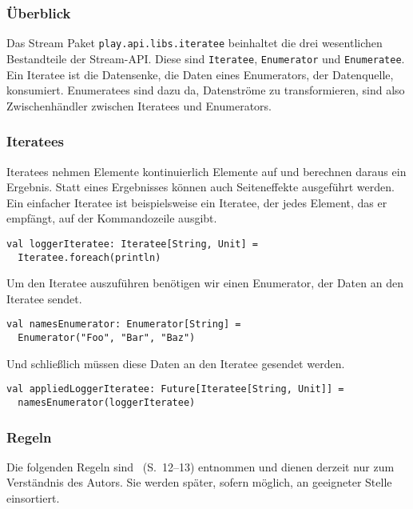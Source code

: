 \documentclass[draft=false
              ,paper=a4
              ,twoside=false
              ,fontsize=11pt
              ,headsepline
              ,BCOR10mm
              ,DIV11
              ]{scrbook}
\begin{document}
\subsubsection{Überblick} %
\label{sssec:streams_ueberblick}

Das Stream Paket \lstinline|play.api.libs.iteratee| beinhaltet die drei wesentlichen Bestandteile der Stream-API.
Diese sind \lstinline|Iteratee|, \lstinline|Enumerator| und \lstinline|Enumeratee|.
Ein Iteratee ist die Datensenke, die Daten eines Enumerators, der Datenquelle, konsumiert.
Enumeratees sind dazu da, Datenströme zu transformieren, sind also Zwischenhändler zwischen Iteratees und Enumerators.



\subsubsection{Iteratees} %
\label{sssec:iteratees}

Iteratees nehmen Elemente kontinuierlich Elemente auf und berechnen daraus ein Ergebnis.
Statt eines Ergebnisses können auch Seiteneffekte ausgeführt werden.
Ein einfacher Iteratee ist beispielsweise ein Iteratee, der jedes Element, das er empfängt, auf der Kommandozeile ausgibt.
\begin{lstlisting}
val loggerIteratee: Iteratee[String, Unit] =
  Iteratee.foreach(println)
\end{lstlisting}
Um den Iteratee auszuführen benötigen wir einen Enumerator, der Daten an den Iteratee sendet.
\begin{lstlisting}
val namesEnumerator: Enumerator[String] =
  Enumerator("Foo", "Bar", "Baz")
\end{lstlisting}
Und schließlich müssen diese Daten an den Iteratee gesendet werden.
\begin{lstlisting}
val appliedLoggerIteratee: Future[Iteratee[String, Unit]] =
  namesEnumerator(loggerIteratee)
\end{lstlisting}



\subsubsection{Regeln} %
\label{ssub:regeln}

Die folgenden Regeln sind \citealt{kiselyov2012}~(S.~12--13) entnommen und dienen derzeit nur zum Verständnis des Autors.
Sie werden später, sofern möglich, an geeigneter Stelle einsortiert.
\end{document}
